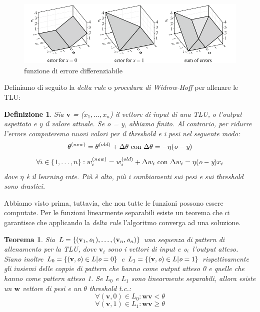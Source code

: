 \documentclass[10pt,a4paper]{article}
\newtheorem{definition}{Definizione}
\newtheorem{theorem}{Teorema}
\newcommand{\ww}{\mathbf{w}}
\newcommand{\vv}{\mathbf{v}}
\begin{document}
\begin{figure}
\centering
\includegraphics[scale=0.4]{img/error2.png}
\caption{funzione di errore differenziabile}
\label{fig:6}
\end{figure}

Definiamo di seguito la \emph{delta rule} o \emph{procedura di Widrow-Hoff} per allenare le TLU:

\begin{definition}
Sia $\vv$ = ($x_1, \dots, x_n$) il vettore di input di una TLU, \emph{o} l'output aspettato e \emph{y} il valore attuale. Se \emph{o} = \emph{y}, abbiamo finito. Al contrario, per ridurre l'errore computeremo nuovi valori per il threshold e i pesi nel seguente modo:
$$
\theta^{(new)} = \theta^{(old)} + \Delta\theta \text{ con } \Delta\theta = -\eta(\emph{o} - \emph{y})
$$
$$
\forall i \in \{1, \dots, n\}:w_i^{(new)} = w_i^{(old)} + \Delta w_i \text{ con } \Delta w_i = \eta(\emph{o} - \emph{y})x_i
$$
dove $\eta$ è il \emph{learning rate}. Più è alto, più i cambiamenti sui pesi e sui threshold sono drastici.

\end{definition}

Abbiamo visto prima, tuttavia, che non tutte le funzioni possono essere computate. Per le funzioni linearmente separabili esiste un teorema che ci garantisce che applicando la \emph{delta rule} l'algoritmo converga ad una soluzione.

\begin{theorem}
Sia $L = \{(\vv_1,\emph{o}_1), \dots, (\vv_n,\emph{o}_n)\}$ una sequenza di pattern di allenamento per la TLU, dove $\vv_i$ sono i vettori di input e $\emph{o}_i$ l'output atteso. 
Siano inoltre $L_0 = \{(\vv,\emph{o}) \in L | \emph{o} = 0\}$ e $L_1 = \{(\vv,\emph{o}) \in L | \emph{o} = 1\}$ rispettivamente gli insiemi delle coppie di pattern che hanno come output atteso 0 e quelle che hanno come pattern atteso 1. Se $L_0$ e $L_1$ sono linearmente separabili, allora esiste un $\ww$ vettore di pesi e un $\theta$ threshold t.c.:
$$
\forall (\vv,0) \in L_0: \ww\vv < \theta 
$$
$$
\forall (\vv,1) \in L_1: \ww\vv \geq \theta
$$
\end{theorem}
\end{document}

